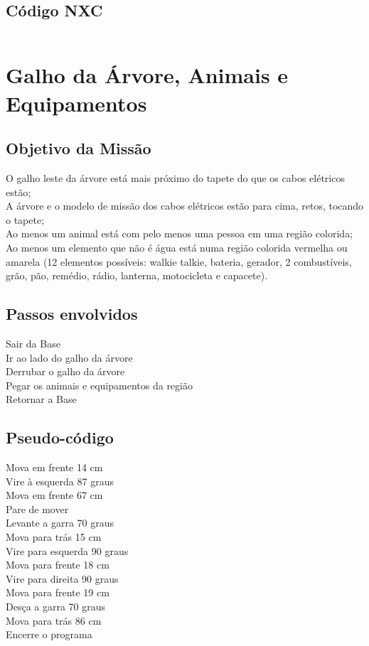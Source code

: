 \documentclass{article}
\begin{document}
	\subsection{Código NXC}
		\begin{tcolorbox}[]
			\inputminted{c}{codes/ambulancia.nxc}
		\end{tcolorbox}

\newpage
\section{Galho da Árvore, Animais e Equipamentos}

	\subsection{Objetivo da Missão}
		O galho leste da árvore está mais próximo do tapete do que os cabos elétricos estão;\\
		A árvore e o modelo de missão dos cabos elétricos estão para cima, retos, tocando o tapete;\\
		Ao menos um animal está com pelo menos uma pessoa em uma região colorida;\\
		Ao menos um elemento que não é água está numa região colorida vermelha ou amarela (12 elementos possíveis: walkie talkie, bateria, gerador, 2 combustíveis, grão, pão, remédio, rádio, lanterna, motocicleta e capacete).\\

	\subsection{Passos envolvidos}
		Sair da Base\\
    	Ir ao lado do galho da árvore\\
    	Derrubar o galho da árvore\\
    	Pegar os animais e equipamentos da região\\
   		Retornar a Base\\

   	\subsection{Pseudo-código}
   		Mova em frente 14 cm\\
	    Vire à esquerda 87 graus\\
	    Mova em frente 67 cm\\
	    Pare de mover\\
		Levante a garra 70 graus\\
	    Mova para trás 15 cm\\
	    Vire para esquerda 90 graus\\
	    Mova para frente 18 cm\\
	    Vire para direita 90 graus\\
	    Mova para frente 19 cm\\
	    Desça a garra 70 graus\\
	    Mova para trás 86 cm\\
	    Encerre o programa\\
\end{document}
